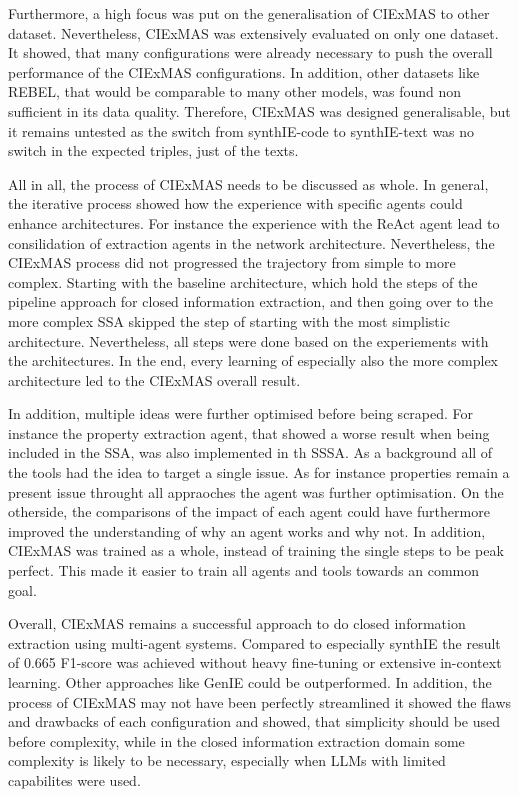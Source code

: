 \documentclass[a4paper,oneside,bibliography=totoc]{scrbook}
\begin{document}
Furthermore, a high focus was put on the generalisation of CIExMAS to other dataset. Nevertheless, CIExMAS was extensively evaluated on only one dataset. It showed, that many configurations were already necessary to push the overall performance of the CIExMAS configurations. In addition, other datasets like REBEL, that would be comparable to many other models, was found non sufficient in its data quality. Therefore, CIExMAS was designed generalisable, but it remains untested as the switch from synthIE-code to synthIE-text was no switch in the expected triples, just of the texts.

All in all, the process of CIExMAS needs to be discussed as whole. In general, the iterative process showed how the experience with specific agents could enhance architectures. For instance the experience with the ReAct agent lead to consilidation of extraction agents in the network architecture. Nevertheless, the CIExMAS process did not progressed the trajectory from simple to more complex. Starting with the baseline architecture, which hold the steps of the pipeline approach for closed information extraction, and then going over to the more complex \ac{SSA} skipped the step of starting with the most simplistic architecture. Nevertheless, all steps were done based on the experiements with the architectures. In the end, every learning of especially also the more complex architecture led to the CIExMAS overall result.

In addition, multiple ideas were further optimised before being scraped. For instance the property extraction agent, that showed a worse result when being included in the \ac{SSA}, was also implemented in th \ac{SSSA}. As a background all of the tools had the idea to target a single issue. As for instance properties remain a present issue throught all appraoches the agent was further optimisation. On the otherside, the comparisons of the impact of each agent could have furthermore improved the understanding of why an agent works and why not. In addition, CIExMAS was trained as a whole, instead of training the single steps to be peak perfect. This made it easier to train all agents and tools towards an common goal.

Overall, CIExMAS remains a successful approach to do closed information extraction using multi-agent systems. Compared to especially synthIE the result of 0.665 F1-score was achieved without heavy fine-tuning or extensive in-context learning. Other approaches like GenIE could be outperformed. In addition, the process of CIExMAS may not have been perfectly streamlined it showed the flaws and drawbacks of each configuration and showed, that simplicity should be used before complexity, while in the closed information extraction domain some complexity is likely to be necessary, especially when \acp{LLM} with limited capabilites were used.
\end{document}
